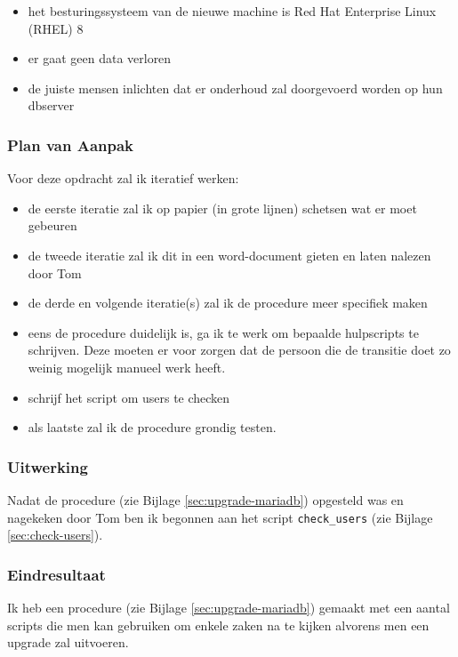 \begin{itemize}
    \item het besturingssysteem van de nieuwe machine is Red Hat Enterprise Linux (RHEL) 8
    \item er gaat geen data verloren
    \item de juiste mensen inlichten dat er onderhoud zal doorgevoerd worden op hun dbserver
\end{itemize}

\subsubsection{Plan van Aanpak}

Voor deze opdracht zal ik iteratief werken:

\begin{itemize}
    \item de eerste iteratie zal ik op papier (in grote lijnen) schetsen wat er moet gebeuren
    \item de tweede iteratie zal ik dit in een word-document gieten en laten nalezen door Tom
    \item de derde en volgende iteratie(s) zal ik de procedure meer specifiek maken
    \item eens de procedure duidelijk is, ga ik te werk om bepaalde hulpscripts te schrijven. Deze moeten er voor zorgen dat de persoon die de transitie doet zo weinig mogelijk manueel werk heeft.
    \item schrijf het script om users te checken
    \item als laatste zal ik de procedure grondig testen.
\end{itemize}

\subsubsection{Uitwerking}

Nadat de procedure (zie Bijlage \ref{sec:upgrade-mariadb}) opgesteld was en nagekeken door Tom ben ik begonnen aan het script \verb*|check_users| (zie Bijlage \ref{sec:check-users}).

\subsubsection{Eindresultaat}

Ik heb een procedure (zie Bijlage \ref{sec:upgrade-mariadb}) gemaakt met een aantal scripts die men kan gebruiken om enkele zaken na te kijken alvorens men een upgrade zal uitvoeren.

